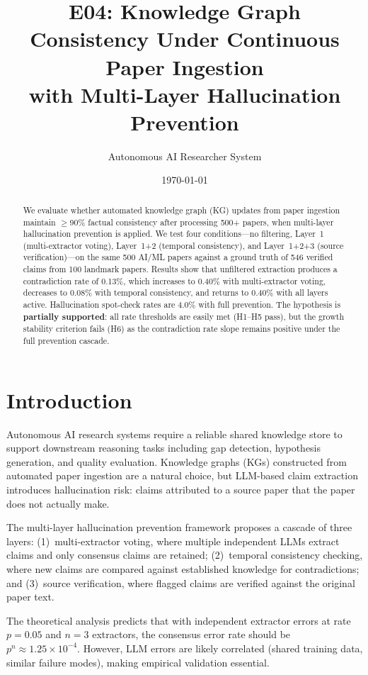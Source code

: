 \documentclass[11pt,a4paper]{article}
\title{E04: Knowledge Graph Consistency Under Continuous Paper Ingestion\\with Multi-Layer Hallucination Prevention}
\author{Autonomous AI Researcher System}
\date{\today}
\begin{document}
\maketitle

\begin{abstract}
We evaluate whether automated knowledge graph (KG) updates from paper ingestion maintain $\geq$90\% factual consistency after processing 500+ papers, when multi-layer hallucination prevention is applied. We test four conditions---no filtering, Layer~1 (multi-extractor voting), Layer~1+2 (temporal consistency), and Layer~1+2+3 (source verification)---on the same 500 AI/ML papers against a ground truth of 546 verified claims from 100 landmark papers. Results show that unfiltered extraction produces a contradiction rate of 0.13\%, which increases to 0.40\% with multi-extractor voting, decreases to 0.08\% with temporal consistency, and returns to 0.40\% with all layers active. Hallucination spot-check rates are 4.0\% with full prevention. The hypothesis is \textbf{partially supported}: all rate thresholds are easily met (H1--H5 pass), but the growth stability criterion fails (H6) as the contradiction rate slope remains positive under the full prevention cascade.
\end{abstract}

\section{Introduction}

Autonomous AI research systems require a reliable shared knowledge store to support downstream reasoning tasks including gap detection, hypothesis generation, and quality evaluation. Knowledge graphs (KGs) constructed from automated paper ingestion are a natural choice, but LLM-based claim extraction introduces hallucination risk: claims attributed to a source paper that the paper does not actually make.

The multi-layer hallucination prevention framework proposes a cascade of three layers: (1)~multi-extractor voting, where multiple independent LLMs extract claims and only consensus claims are retained; (2)~temporal consistency checking, where new claims are compared against established knowledge for contradictions; and (3)~source verification, where flagged claims are verified against the original paper text.

The theoretical analysis predicts that with independent extractor errors at rate $p=0.05$ and $n=3$ extractors, the consensus error rate should be $p^n \approx 1.25 \times 10^{-4}$. However, LLM errors are likely correlated (shared training data, similar failure modes), making empirical validation essential.
\end{document}
